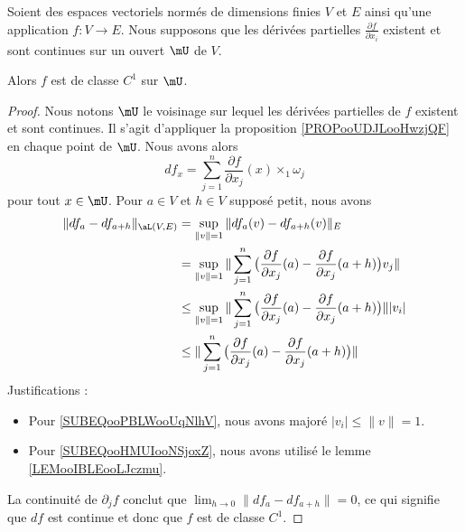 \begin{proposition}     \label{PROPooUUOSooPuXJjQ}
	Soient des espaces vectoriels normés de dimensions finies \( V\) et \( E\) ainsi qu'une application \( f\colon V\to E\). Nous supposons que les dérivées partielles \( \frac{ \partial f }{ \partial x_i }\) existent et sont continues sur un ouvert \( \mU\) de \( V\).

	Alors \( f\) est de classe \( C^1\) sur \( \mU\).
\end{proposition}

\begin{proof}
	Nous notons \( \mU\) le voisinage sur lequel les dérivées partielles de \( f\) existent et sont continues. Il s'agit d'appliquer la proposition \ref{PROPooUDJLooHwzjQF} en chaque point de \( \mU\). Nous avons alors
	\begin{equation}
		df_x=\sum_{j=1}^n\frac{ \partial f }{ \partial x_j }(x)\times_1\omega_j
	\end{equation}
	pour tout \( x\in \mU\). Pour \( a\in V\) et \( h\in V\) supposé petit, nous avons
	\begin{subequations}
		\begin{align}
			\| df_a-df_{a+h} \|_{\aL(V,E)} & =\sup_{\| v \|=1}\| df_a(v)-df_{a+h}(v) \|_E                                                                                                                              \\
			                               & =\sup_{\| v \|=1}\| \sum_{j=1}^n\big( \frac{ \partial f }{ \partial x_j }(a)-\frac{ \partial f }{ \partial x_j }(a+h) \big)v_j \|                                         \\
			                               & \leq \sup_{\| v \|=1}\| \sum_{j=1}^n\big( \frac{ \partial f }{ \partial x_j }(a)-\frac{ \partial f }{ \partial x_j }(a+h) \big) \| |v_i |     \label{SUBEQooHMUIooNSjoxZ} \\
			                               & \leq\| \sum_{j=1}^n\big( \frac{ \partial f }{ \partial x_j }(a)-\frac{ \partial f }{ \partial x_j }(a+h) \big) \|      \label{SUBEQooPBLWooUqNlhV}
		\end{align}
	\end{subequations}
	Justifications :
	\begin{itemize}
		\item
		      Pour \eqref{SUBEQooPBLWooUqNlhV}, nous avons majoré \( | v_i |\leq \| v \|=1\).
		\item
		      Pour \eqref{SUBEQooHMUIooNSjoxZ}, nous avons utilisé le lemme \ref{LEMooIBLEooLJczmu}.
	\end{itemize}
	La continuité de \( \partial_jf\) conclut que \( \lim_{h\to 0}\|  df_a-df_{a+h}  \|=0\), ce qui signifie que \( df\) est continue et donc que \( f\) est de classe \( C^1\).
\end{proof}

